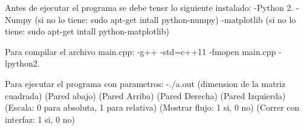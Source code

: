 Antes de ejecutar el programa se debe tener lo siguiente instalado\+: -\/\+Python 2. -\/\+Numpy (si no lo tiene\+: sudo apt-\/get intall python-\/numpy) -\/matplotlib (si no lo tiene\+: sudo apt-\/get intall python-\/matplotlib)

Para compilar el archivo main.\+cpp\+: -\/g++ -\/std=c++11 -\/fmopen main.\+cpp -\/lpython2.

Para ejecutar el programa con parametros\+: -\/./a.out (dimension de la matriz cuadrada) (Pared abajo) (Pared Arriba) (Pared Derecha) (Pared Izquierda) (Escala\+: 0 para absoluta, 1 para relativa) (Mostrar flujo\+: 1 si, 0 no) (Correr con interfaz\+: 1 si, 0 no) 